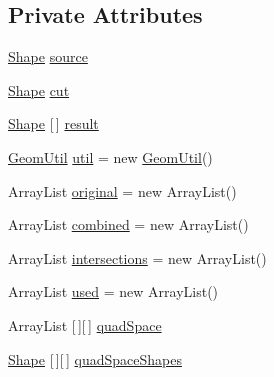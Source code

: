 \subsection*{Private Attributes}
\begin{DoxyCompactItemize}
\item 
\mbox{\hyperlink{classorg_1_1newdawn_1_1slick_1_1geom_1_1_shape}{Shape}} \mbox{\hyperlink{classorg_1_1newdawn_1_1slick_1_1tests_1_1_geom_util_tile_test_a39977584c02a26134cc93335ce2a1d51}{source}}
\item 
\mbox{\hyperlink{classorg_1_1newdawn_1_1slick_1_1geom_1_1_shape}{Shape}} \mbox{\hyperlink{classorg_1_1newdawn_1_1slick_1_1tests_1_1_geom_util_tile_test_a4cfe8754d2f3aeb90b48a925fe0d1112}{cut}}
\item 
\mbox{\hyperlink{classorg_1_1newdawn_1_1slick_1_1geom_1_1_shape}{Shape}} \mbox{[}$\,$\mbox{]} \mbox{\hyperlink{classorg_1_1newdawn_1_1slick_1_1tests_1_1_geom_util_tile_test_a46f0f8b643b197ecbd363059b1555f31}{result}}
\item 
\mbox{\hyperlink{classorg_1_1newdawn_1_1slick_1_1geom_1_1_geom_util}{Geom\+Util}} \mbox{\hyperlink{classorg_1_1newdawn_1_1slick_1_1tests_1_1_geom_util_tile_test_aa29787931045895dd282b7b821145e02}{util}} = new \mbox{\hyperlink{classorg_1_1newdawn_1_1slick_1_1geom_1_1_geom_util}{Geom\+Util}}()
\item 
Array\+List \mbox{\hyperlink{classorg_1_1newdawn_1_1slick_1_1tests_1_1_geom_util_tile_test_a8aaaaee0d0ab2ac3b0a21ccb95983bda}{original}} = new Array\+List()
\item 
Array\+List \mbox{\hyperlink{classorg_1_1newdawn_1_1slick_1_1tests_1_1_geom_util_tile_test_af1dbc2f8a0c508f3632c7cb514b94582}{combined}} = new Array\+List()
\item 
Array\+List \mbox{\hyperlink{classorg_1_1newdawn_1_1slick_1_1tests_1_1_geom_util_tile_test_a956de47fcbfd8a345b2b42602bb65e7c}{intersections}} = new Array\+List()
\item 
Array\+List \mbox{\hyperlink{classorg_1_1newdawn_1_1slick_1_1tests_1_1_geom_util_tile_test_a6be492c2a117f930c9f326d72da0cc96}{used}} = new Array\+List()
\item 
Array\+List \mbox{[}$\,$\mbox{]}\mbox{[}$\,$\mbox{]} \mbox{\hyperlink{classorg_1_1newdawn_1_1slick_1_1tests_1_1_geom_util_tile_test_a669ad26af6e1635deb8855d2df3788bb}{quad\+Space}}
\item 
\mbox{\hyperlink{classorg_1_1newdawn_1_1slick_1_1geom_1_1_shape}{Shape}} \mbox{[}$\,$\mbox{]}\mbox{[}$\,$\mbox{]} \mbox{\hyperlink{classorg_1_1newdawn_1_1slick_1_1tests_1_1_geom_util_tile_test_ac0451795d8b1fc03cbd0c348e32e86c8}{quad\+Space\+Shapes}}
\end{DoxyCompactItemize}
